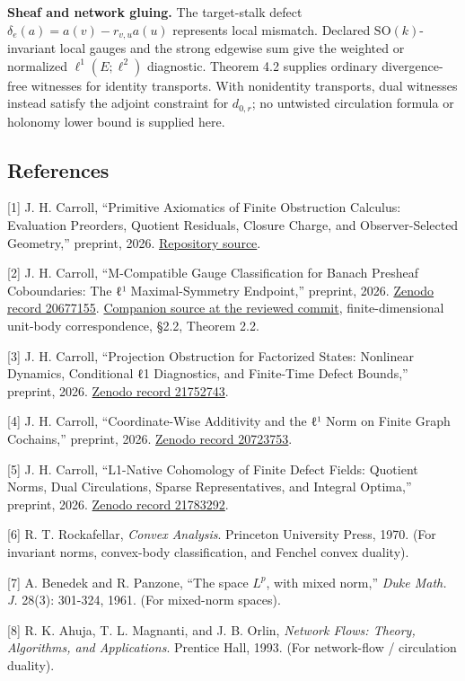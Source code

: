 \documentclass[
  11pt,
]{article}
\begin{document}
\textbf{Sheaf and network gluing.} The target-stalk defect
\(\delta_e(a)=a(v)-r_{v,u}a(u)\) represents local mismatch. Declared
\(\mathrm{SO}(k)\)-invariant local gauges and the strong edgewise sum
give the weighted or normalized \(\ell^1(E;\ell^2)\) diagnostic. Theorem
4.2 supplies ordinary divergence-free witnesses for identity transports.
With nonidentity transports, dual witnesses instead satisfy the adjoint
constraint for \(d_{0,r}\); no untwisted circulation formula or holonomy
lower bound is supplied here.

\newpage

\subsection{References}\label{references}

{[}1{]} J. H. Carroll, ``Primitive Axiomatics of Finite Obstruction
Calculus: Evaluation Preorders, Quotient Residuals, Closure Charge, and
Observer-Selected Geometry,'' preprint, 2026.
\href{https://github.com/dbccpage/the_symbol_game/tree/adc3d57001a0491945fce1ccd203f696c57c389b/omega_engine_atlas/coda_atlas/F004_papers/001_finite_obstruction_calculus/006_primitive_axiomatics}{Repository
source}.

{[}2{]} J. H. Carroll, ``M-Compatible Gauge Classification for Banach
Presheaf Coboundaries: The ℓ¹ Maximal-Symmetry Endpoint,'' preprint,
2026. \href{https://zenodo.org/records/20677155}{Zenodo record
20677155}.
\href{https://github.com/dbccpage/the_symbol_game/tree/adc3d57001a0491945fce1ccd203f696c57c389b/omega_engine_atlas/coda_atlas/F004_papers/002_projection_obstruction/007_m_compatible_gauge_classification}{Companion
source at the reviewed commit}, finite-dimensional unit-body
correspondence, §2.2, Theorem 2.2.

{[}3{]} J. H. Carroll, ``Projection Obstruction for Factorized States:
Nonlinear Dynamics, Conditional ℓ1 Diagnostics, and Finite-Time Defect
Bounds,'' preprint, 2026.
\href{https://zenodo.org/records/21752743}{Zenodo record 21752743}.

{[}4{]} J. H. Carroll, ``Coordinate-Wise Additivity and the ℓ¹ Norm on
Finite Graph Cochains,'' preprint, 2026.
\href{https://zenodo.org/records/20723753}{Zenodo record 20723753}.

{[}5{]} J. H. Carroll, ``L1-Native Cohomology of Finite Defect Fields:
Quotient Norms, Dual Circulations, Sparse Representatives, and Integral
Optima,'' preprint, 2026.
\href{https://zenodo.org/records/21783292}{Zenodo record 21783292}.

{[}6{]} R. T. Rockafellar, \emph{Convex Analysis}. Princeton University
Press, 1970. (For invariant norms, convex-body classification, and
Fenchel convex duality).

{[}7{]} A. Benedek and R. Panzone, ``The space \(L^p\), with mixed
norm,'' \emph{Duke Math. J.} 28(3): 301-324, 1961. (For mixed-norm
spaces).

{[}8{]} R. K. Ahuja, T. L. Magnanti, and J. B. Orlin, \emph{Network
Flows: Theory, Algorithms, and Applications}. Prentice Hall, 1993. (For
network-flow / circulation duality).
\end{document}
